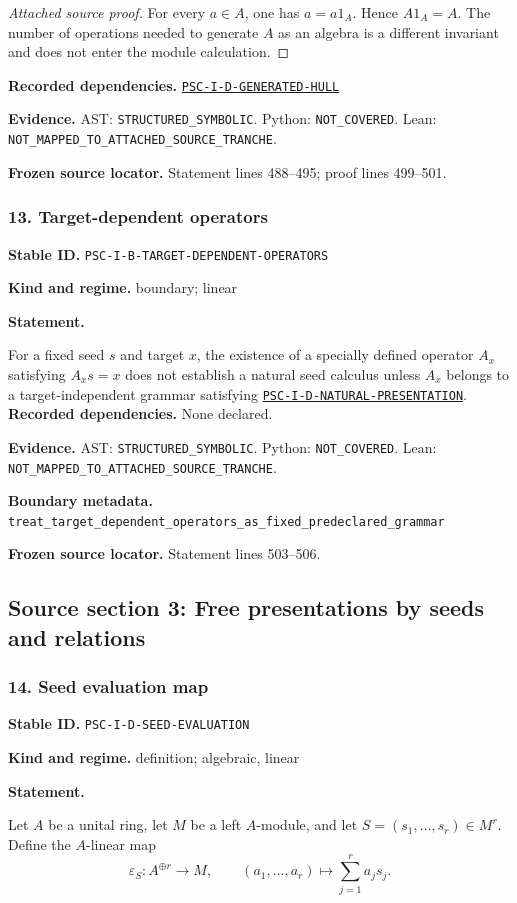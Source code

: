 \documentclass[a4paper,11pt]{article}
\newcommand{\field}[2]{\noindent\textbf{#1.} #2\par}
\begin{document}
\begin{proof}[Attached source proof]
For every $a\in A$, one has $a=a1_A$.  Hence $A1_A=A$.  The number of operations needed to generate $A$ as an algebra is a different invariant and does not enter the module calculation.
\end{proof}
\field{Recorded dependencies}{\hyperref[rec:PSC-I-D-GENERATED-HULL]{\nolinkurl{PSC-I-D-GENERATED-HULL}}}
\field{Evidence}{AST: \nolinkurl{STRUCTURED_SYMBOLIC}. Python: \nolinkurl{NOT_COVERED}. Lean: \nolinkurl{NOT_MAPPED_TO_ATTACHED_SOURCE_TRANCHE}.}
\field{Frozen source locator}{Statement lines 488--495; proof lines 499--501.}
\subsubsection*{13. Target-dependent operators}
\label{rec:PSC-I-B-TARGET-DEPENDENT-OPERATORS}
\field{Stable ID}{\nolinkurl{PSC-I-B-TARGET-DEPENDENT-OPERATORS}}
\field{Kind and regime}{boundary; linear}
\textbf{Statement.}\par
For a fixed seed $s$ and target $x$, the existence of a specially defined operator $A_x$ satisfying $A_xs=x$ does not establish a natural seed calculus unless $A_x$ belongs to a target-independent grammar satisfying \hyperref[rec:PSC-I-D-NATURAL-PRESENTATION]{\nolinkurl{PSC-I-D-NATURAL-PRESENTATION}}.
\field{Recorded dependencies}{None declared.}
\field{Evidence}{AST: \nolinkurl{STRUCTURED_SYMBOLIC}. Python: \nolinkurl{NOT_COVERED}. Lean: \nolinkurl{NOT_MAPPED_TO_ATTACHED_SOURCE_TRANCHE}.}
\field{Boundary metadata}{\nolinkurl{treat_target_dependent_operators_as_fixed_predeclared_grammar}}
\field{Frozen source locator}{Statement lines 503--506.}
\clearpage\subsection{Source section 3: Free presentations by seeds and relations}
\subsubsection*{14. Seed evaluation map}
\label{rec:PSC-I-D-SEED-EVALUATION}
\field{Stable ID}{\nolinkurl{PSC-I-D-SEED-EVALUATION}}
\field{Kind and regime}{definition; algebraic, linear}
\textbf{Statement.}\par
Let $A$ be a unital ring, let $M$ be a left $A$-module, and let $S=(s_1,\ldots,s_r)\in M^r$.  Define the $A$-linear map
\[
\varepsilon_S:A^{\oplus r}\longrightarrow M,
\qquad
(a_1,\ldots,a_r)\longmapsto\sum_{j=1}^{r}a_js_j.
\]
\end{document}
